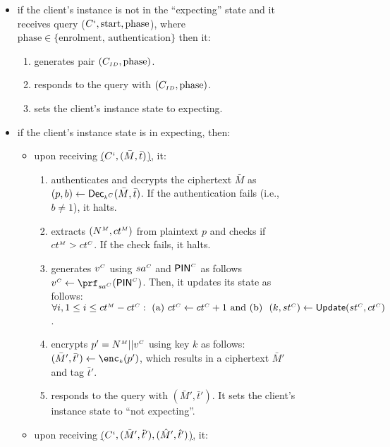\begin{figure}[H]
\begin{center}
\begin{tcolorbox}[enhanced,width=4.7in,left=0.1cm, 
    drop fuzzy shadow southwest,
    colframe=black,colback=white]
{{ \begin{itemize}[leftmargin=.4cm]
 \item if the client's instance is not in the ``expecting'' state and it receives query  \send($C^{\scriptscriptstyle i}, \text{start}, \text{phase}$), where $\text{phase}\in \{\text {enrolment, authentication}\}$ then it: 
  \begin{enumerate}
  \item generates pair $(C_{\scriptscriptstyle ID},  \text{phase})$. 
  \item responds to the query with $(C_{\scriptscriptstyle ID},  \text{phase})$. 
  \item sets the client's instance state to expecting.
  \end{enumerate}
 \item if the client's instance state is in expecting, then: 
 \begin{itemize}[leftmargin=.4cm]
 \item upon receiving \underline{\send($C^{\scriptscriptstyle i}, (\bar M, \bar t)$)}, it:
  \begin{enumerate}
  \item authenticates and decrypts the ciphertext $\bar M$ as $(p, b) \gets \mathsf{Dec}_{\scriptscriptstyle k^{\scriptscriptstyle C}}(\bar M, \bar t)$. If the authentication fails (i.e., $b\neq 1$), it halts.  
  \item extracts $({N}^{\scriptscriptstyle M}, {ct}^{\scriptscriptstyle M})$ from plaintext $p$ and checks if ${ct}^{\scriptscriptstyle M} > {ct}^{\scriptscriptstyle C} $. If the check fails, it halts. 
  \item generates ${v}^{\scriptscriptstyle C}$ using ${sa}^{\scriptscriptstyle C}$ and $\mathsf{PIN}^{\scriptscriptstyle C}$ as follows $\VC{\verifier} \gets \prf_{\VC{\salt}}(\VC{\pin})$. Then, it updates its state as follows: $\forall i, 1\leq i\leq {ct}^{\scriptscriptstyle M}- {ct}^{\scriptscriptstyle C}: \text{\ (a)\ } {ct}^{\scriptscriptstyle C} \gets {ct}^{\scriptscriptstyle C} + 1\text{\ and (b) \ } (k,  {st}^{\scriptscriptstyle C}) \gets \mathsf{Update}({st}^{\scriptscriptstyle C}, {ct}^{\scriptscriptstyle C})$. 
  \item encrypts $p'={N}^{\scriptscriptstyle M}||{v}^{\scriptscriptstyle C}$ using key $k$  as follows: $(\bar M', \bar t') \gets \enc_{\sss k}(p')$, which results in a ciphertext $\bar M'$ and tag $\bar t'$. 
  \item responds to the query with $(\bar M', \bar t')$. It sets the client's instance state to ``not expecting''.  
  \end{enumerate}
 \item  upon receiving \underline{\send($C^{\scriptscriptstyle i}, (\ddot M', \ddot t'), (\hat M', \hat t')$)}, it: 
 \begin{enumerate}

\end{enumerate}
\end{itemize}
\end{itemize}}}
\end{tcolorbox}
\end{center}
\end{figure}
